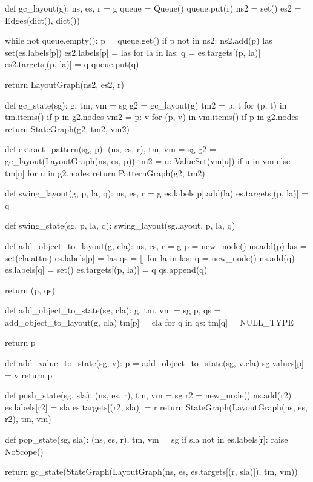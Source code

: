 \begin{dispPy}
def gc_layout(g):
    ns, es, r = g
    queue = Queue()
    queue.put(r)
    ns2 = set()
    es2 = Edges(dict(), dict())

    while not queue.empty():
        p = queue.get()
        if p not in ns2:
            ns2.add(p)
            las = set(es.labels[p])
            es2.labels[p] = las
            for la in las:
                q = es.targets[(p, la)]
                es2.targets[(p, la)] = q
                queue.put(q)

    return LayoutGraph(ns2, es2, r)

def gc_state(sg):
    g, tm, vm = sg
    g2 = gc_layout(g)
    tm2 = {p: t for (p, t) in tm.items() if p in g2.nodes}
    vm2 = {p: v for (p, v) in vm.items() if p in g2.nodes}
    return StateGraph(g2, tm2, vm2)

def extract_pattern(sg, p):
    (ns, es, r), tm, vm = sg
    g2 = gc_layout(LayoutGraph(ns, es, p))
    tm2 = {u: ValueSet({vm[u]}) if u in vm else tm[u] for u in g2.nodes}
    return PatternGraph(g2, tm2)

def swing_layout(g, p, la, q):
    ns, es, r = g
    es.labels[p].add(la)
    es.targets[(p, la)] = q

def swing_state(sg, p, la, q):
    swing_layout(sg.layout, p, la, q)

def add_object_to_layout(g, cla):
    ns, es, r = g
    p = new_node()
    ns.add(p)
    las = set(cla.attrs)
    es.labels[p] = las
    qs = []
    for la in las:
        q = new_node()
        ns.add(q)
        es.labels[q] = set()
        es.targets[(p, la)] = q
        qs.append(q)

    return (p, qs)

def add_object_to_state(sg, cla):
    g, tm, vm = sg
    p, qs  = add_object_to_layout(g, cla)
    tm[p] = cla
    for q in qs:
        tm[q] = NULL_TYPE

    return p

def add_value_to_state(sg, v):
    p  = add_object_to_state(sg, v.cla)
    sg.values[p] = v
    return p

def push_state(sg, sla):
    (ns, es, r), tm, vm = sg
    r2 = new_node()
    ns.add(r2)
    es.labels[r2] = {sla}
    es.targets[(r2, sla)] = r
    return StateGraph(LayoutGraph(ns, es, r2), tm, vm)

def pop_state(sg, sla):
    (ns, es, r), tm, vm = sg
    if sla not in es.labels[r]:
        raise NoScope()

    return gc_state(StateGraph(LayoutGraph(ns, es, es.targets[(r, sla)]), tm, vm))


\end{dispPy}
